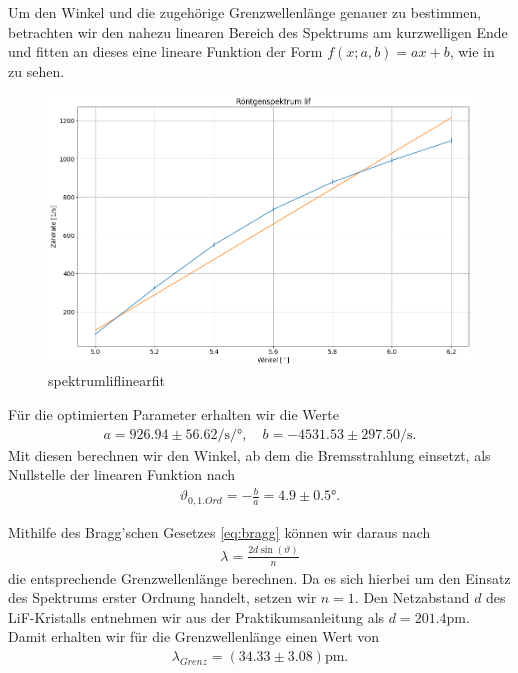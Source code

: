 Um den Winkel und die zugehörige Grenzwellenlänge genauer zu bestimmen, betrachten wir den nahezu linearen Bereich des Spektrums am kurzwelligen Ende und fitten an dieses eine lineare Funktion der Form $f(x;a,b) = ax + b$, wie in  zu sehen.

\begin{figure}[H]
  \centering
  \includegraphics[width=.9\textwidth]{files/plots/spektrum_lif_linear_fit.png}
  \caption{spektrumliflinearfit}
  \label{fig:spektrum_lif_linear_fit}
\end{figure}

Für die optimierten Parameter erhalten wir die Werte
\begin{align}
  a = 926.94 \pm 56.62 \si{\per\second\per\degree},\quad
  b = -4531.53 \pm 297.50 \si{\per\second}.
\end{align}
Mit diesen berechnen wir den Winkel, ab dem die Bremsstrahlung einsetzt, als Nullstelle der linearen Funktion nach
\begin{align}
  \vartheta_{0,1. Ord} = -\frac{b}{a} = 4.9 \pm 0.5 \si{\degree}.
\end{align}

Mithilfe des Bragg'schen Gesetzes \eqref{eq:bragg} können wir daraus nach
\begin{align}
  \lambda = \frac{2d\sin(\vartheta)}{n}
\end{align}
die entsprechende Grenzwellenlänge berechnen. Da es sich hierbei um den Einsatz des Spektrums erster Ordnung handelt, setzen wir $n = 1$. Den Netzabstand $d$ des LiF-Kristalls entnehmen wir aus der Praktikumsanleitung als $d = 201.4\si{\pico\meter}$. Damit erhalten wir für die Grenzwellenlänge einen Wert von
\begin{align}
  \lambda_{Grenz} = (34.33 \pm 3.08) \si{\pico\meter}.
\end{align}

